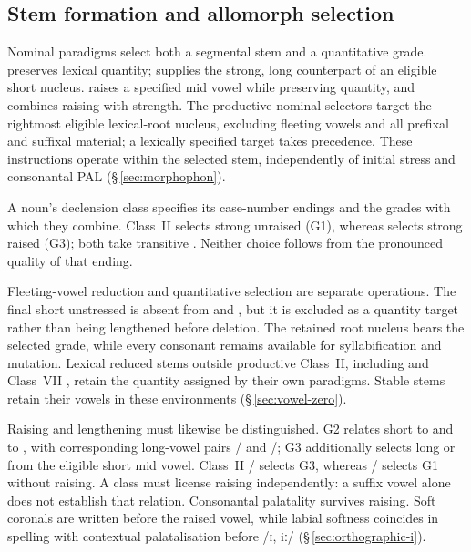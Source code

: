 \subsection{Stem formation and allomorph selection}
\label{sec:nm-stemform}
\label{sec:nm-stem-grades}

Nominal paradigms select both a segmental stem and a quantitative grade.
 preserves lexical quantity;  supplies the strong, long
counterpart of an eligible short nucleus.  raises a specified mid
vowel while preserving quantity, and  combines raising with
strength. The productive nominal selectors target the rightmost eligible
lexical-root nucleus, excluding fleeting vowels and all prefixal and suffixal
material; a lexically specified target takes precedence. These instructions
operate within the selected stem, independently of initial stress and
consonantal PAL (§\,\ref{sec:morphophon}).

A noun's declension class specifies its case-number endings and the grades
with which they combine. Class~II  selects strong unraised
 (G1), whereas  selects strong raised
 (G3); both take transitive . Neither choice follows
from the pronounced quality of that ending.

Fleeting-vowel reduction and quantitative selection are separate operations.
The final short unstressed  is absent from  and
, but it is excluded as a quantity target rather than being
lengthened before deletion. The retained root nucleus bears the selected
grade, while every consonant remains available for syllabification and
mutation. Lexical reduced stems outside productive Class~II, including
 and Class~VII , retain the quantity assigned by
their own paradigms. Stable stems retain their vowels in these environments
(§\,\ref{sec:vowel-zero}).

Raising and lengthening must likewise be distinguished. G2 relates short
 to  and  to , with corresponding
long-vowel pairs / and /; G3 additionally
selects long  or  from the eligible short mid vowel.
Class~II / selects G3, whereas
/ selects G1 without raising. A class must license
raising independently: a suffix vowel alone does not establish that relation.
Consonantal palatality survives raising. Soft coronals are written
 before the raised vowel, while labial softness
coincides in spelling with contextual palatalisation before /ɪ, iː/
(§\,\ref{sec:orthographic-i}).

